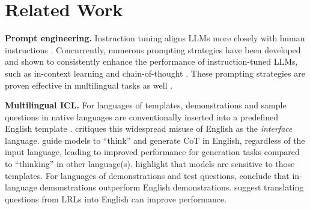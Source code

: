\section{Related Work}
\noindent\textbf{Prompt engineering.} Instruction tuning aligns LLMs more closely with human instructions \cite{instructGPT,cross_task_generalization, ft_lm_are_zs_learners,general_language_assistant,super_natural_instructions, self_instruct}. Concurrently, numerous prompting strategies have been developed \cite{prompt_survey} and shown to consistently enhance the performance of instruction-tuned LLMs, such as in-context learning \cite{lm_are_few_shot_learner,rethink_demonstration} and chain-of-thought \cite{cot,lm_zero_shot_reasoner}. These prompting strategies are proven effective in multilingual tasks as well \cite{lm_few_shot_multilingual_learner,few_shot_learning_multilingual_lm, mgsm}.

\vspace{2pt}\noindent\textbf{Multilingual ICL.} 
For languages of templates, demonstrations and sample questions in native languages are conventionally inserted into a predefined English template \cite{few_shot_learning_multilingual_lm,polyglot_prompt,cross_lingual_prompting,not_all_language_are_created_equal,mega,plug}.  
\citet{roles_of_english} critiques this widespread misuse of English as the \textit{interface} language. \citet{cross_lingual_prompting,not_all_language_are_created_equal,plug} guide models to ``think'' and generate CoT in English, regardless of the input language, leading to improved performance for generation tasks compared to ``thinking'' in other language(s). \citet{sensitivity_prompt_design,impact_demonstration_multilingual_icl} highlight that models are sensitive to those templates.
For languages of demonstrations and test questions, \citet{mgsm,mega} conclude that in-language demonstrations outperform English demonstrations. \citet{do_llm_think_better_in_english,is_translation_all_you_need} suggest translating questions from LRLs into English can improve performance.
